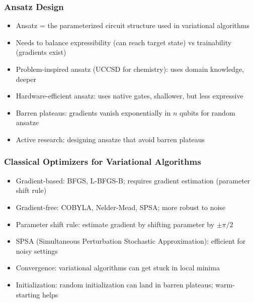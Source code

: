 \begin{frame}[fragile]\frametitle{Ansatz Design}
\begin{itemize}
\item Ansatz = the parameterized circuit structure used in variational algorithms
\item Needs to balance expressibility (can reach target state) vs trainability (gradients exist)
\item Problem-inspired ansatz (UCCSD for chemistry): uses domain knowledge, deeper
\item Hardware-efficient ansatz: uses native gates, shallower, but less expressive
\item Barren plateaus: gradients vanish exponentially in $n$ qubits for random ansatze
\item Active research: designing ansatze that avoid barren plateaus
\end{itemize}
\end{frame}

\begin{frame}[fragile]\frametitle{Classical Optimizers for Variational Algorithms}
\begin{itemize}
\item Gradient-based: BFGS, L-BFGS-B; requires gradient estimation (parameter shift rule)
\item Gradient-free: COBYLA, Nelder-Mead, SPSA; more robust to noise
\item Parameter shift rule: estimate gradient by shifting parameter by $\pm\pi/2$
\item SPSA (Simultaneous Perturbation Stochastic Approximation): efficient for noisy settings
\item Convergence: variational algorithms can get stuck in local minima
\item Initialization: random initialization can land in barren plateaus; warm-starting helps
\end{itemize}
\end{frame}

